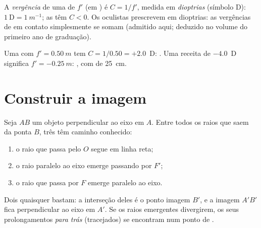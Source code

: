 \begin{definition}[Vergência]\label{def:g11:lenses-and-eye:vergence}
A \emph{vergência} de uma  de  $f'$
(em ) é $C = 1/f'$, medida em \emph{dioptrias}
(símbolo D): $1~\text{D} = \qty{1}{m^{-1}}$; as  têm
$C < 0$. Os oculistas prescrevem em dioptrias: as vergências de  em contato simplesmente se somam (admitido aqui; deduzido no
volume do primeiro ano de graduação).
\end{definition}

\begin{example}\label{ex:g11:lenses-and-eye:vergence}
Uma  com $f' = \qty{0.50}{m}$ tem $C = 1/0.50 = +2.0$~D:
. Uma receita de $-4.0$~D significa $f' = \qty{-0.25}{m}$:
, com  de \qty{25}{cm}.
\end{example}

\section{Construir a imagem}

\begin{method}\label{met:g11:lenses-and-eye:rays}
Seja $AB$ um objeto perpendicular ao eixo em $A$. Entre todos os raios
que saem da ponta $B$, três têm caminho conhecido:
\begin{enumerate}
  \item o raio que passa pelo  $O$ segue em linha reta;
  \item o raio paralelo ao eixo emerge passando por $F'$;
  \item o raio que passa por $F$ emerge paralelo ao eixo.
\end{enumerate}
Dois quaisquer bastam: a interseção deles é o ponto imagem $B'$, e a
imagem $A'B'$ fica perpendicular ao eixo em $A'$. Se os raios emergentes
divergirem, os seus prolongamentos \emph{para trás} (tracejados) se
encontram num ponto de .
\end{method}

